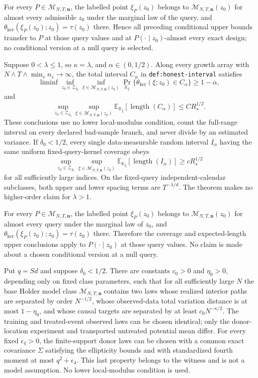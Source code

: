 For every \(P\in\mathcal M_{N,T,\mathbf n}\), the labelled point
\(\xi_P(z_0)\) belongs to \(\mathcal M_{N,T,\mathbf n}(z_0)\) for almost
every admissible \(z_0\) under the marginal law of the query, and
\(\theta_{\mathrm{ker}}(\xi_P(z_0);z_0)=\tau(z_0)\) there.  Hence all
preceding conditional upper bounds transfer to \(P\) at those query values
and at \(P(\cdot\mid z_0)\)-almost every exact design; no conditional version
at a null query is selected.

Suppose \(0<\lambda\le1\), so \(\kappa=\lambda\), and
\(\alpha\in(0,1/2)\).  Along every growth array with
\(N\wedge T\wedge\min_s n_s\to\infty\), the total interval \(C_\alpha\)
in \texttt{def:honest-interval} satisfies
\[
 \liminf
 \inf_{z_0\in\mathcal Z_{\delta_0}}
 \inf_{\xi\in\mathcal M_{N,T,\mathbf n}(z_0)}
 \Pr_{\mathbb K_\xi}
 \{\theta_{\mathrm{ker}}(\xi;z_0)\in C_\alpha\}
 \ge1-\alpha,
\]
and
\[
 \sup_{z_0\in\mathcal Z_{\delta_0}}
 \sup_{\xi\in\mathcal M_{N,T,\mathbf n}(z_0)}
 \mathbb E_{\mathbb K_\xi}[\operatorname{length}(C_\alpha)]
 \le CR_\star^{1/2}.
\]
These conclusions use no lower local-modulus condition, count the full-range
interval on every declared bad-sample branch, and never divide by an
estimated variance.  If \(\delta_0<1/2\), every single data-measurable
random interval \(I_\alpha\) having the same uniform fixed-query-kernel
coverage obeys
\[
 \sup_{z_0\in\mathcal Z_{\delta_0}}
 \sup_{\xi\in\mathcal M_{N,T,\mathbf n}(z_0)}
 \mathbb E_{\mathbb K_\xi}[\operatorname{length}(I_\alpha)]
 \ge cR_\star^{1/2}
\]
for all sufficiently large indices.  On the fixed-query
independent-calendar subclasses, both upper and lower spacing terms are
\(T^{-\lambda/d}\).  The theorem makes no higher-order claim for
\(\lambda>1\).

For every \(P\in\mathcal M_{N,T,\mathbf n}\), the labelled point
\(\xi_P(z_0)\) belongs to \(\mathcal M_{N,T,\mathbf n}(z_0)\) for almost
every query under the marginal law of \(z_0\), and
\(\theta_{\mathrm{ker}}(\xi_P(z_0);z_0)=\tau(z_0)\) there.  Therefore the
coverage and expected-length upper conclusions apply to
\(P(\cdot\mid z_0)\) at those query values.  No claim is made about a
chosen conditional version at a null query.

Put \(q=Sd\) and suppose \(\delta_0<1/2\).  There are constants
\(c_0>0\) and \(\eta_0>0\), depending only on fixed class parameters, such
that for all sufficiently large \(N\) the base Holder model class
\(\mathcal M_{N,T,\mathbf n}\) contains two laws whose realized interior
paths are separated by order \(N^{-1/2}\), whose observed-data total
variation distance is at most \(1-\eta_0\), and whose causal targets are
separated by at least \(c_0N^{-\kappa/2}\).  The training and treated-event
observed laws can be chosen identical; only the donor-location experiment
and transported untreated potential mean differ.  For every fixed
\(\epsilon_4>0\), the finite-support donor laws can be chosen with a common
exact covariance \(\Sigma\) satisfying the ellipticity bounds and with
standardized fourth moment at most \(q^2+\epsilon_4\).  This last property
belongs to the witness and is not a model assumption.  No lower
local-modulus condition is used.

